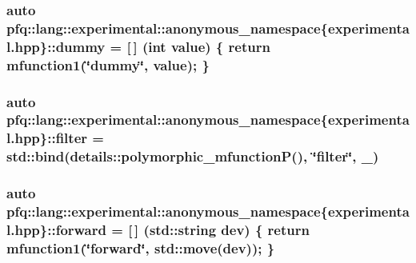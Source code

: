 \hypertarget{namespacepfq_1_1lang_1_1experimental_1_1anonymous__namespace_02experimental_8hpp_03_a5fc8274e9598b8524f833264174b62b7}{
\subsubsection[{dummy}]{\setlength{\rightskip}{0pt plus 5cm}auto pfq\+::lang\+::experimental\+::anonymous\+\_\+namespace\{experimental.\+hpp\}\+::dummy = \mbox{[}$\,$\mbox{]} (int value) \{ return {\bf mfunction1}(\char`\"{}dummy\char`\"{}, value); \}}}\label{namespacepfq_1_1lang_1_1experimental_1_1anonymous__namespace_02experimental_8hpp_03_a5fc8274e9598b8524f833264174b62b7}
\hypertarget{namespacepfq_1_1lang_1_1experimental_1_1anonymous__namespace_02experimental_8hpp_03_ae9cec76098e666e9b129804f44a93ae1}{
\subsubsection[{filter}]{\setlength{\rightskip}{0pt plus 5cm}auto pfq\+::lang\+::experimental\+::anonymous\+\_\+namespace\{experimental.\+hpp\}\+::filter = std\+::bind(details\+::polymorphic\+\_\+mfunction\+P(), \char`\"{}filter\char`\"{}, \+\_)}}\label{namespacepfq_1_1lang_1_1experimental_1_1anonymous__namespace_02experimental_8hpp_03_ae9cec76098e666e9b129804f44a93ae1}
\hypertarget{namespacepfq_1_1lang_1_1experimental_1_1anonymous__namespace_02experimental_8hpp_03_a52cf166afea2ff74bffc6efbf839af0a}{
\subsubsection[{forward}]{\setlength{\rightskip}{0pt plus 5cm}auto pfq\+::lang\+::experimental\+::anonymous\+\_\+namespace\{experimental.\+hpp\}\+::forward = \mbox{[}$\,$\mbox{]} (std\+::string dev) \{ return {\bf mfunction1}(\char`\"{}forward\char`\"{}, std\+::move(dev)); \}}}\label{namespacepfq_1_1lang_1_1experimental_1_1anonymous__namespace_02experimental_8hpp_03_a52cf166afea2ff74bffc6efbf839af0a}
